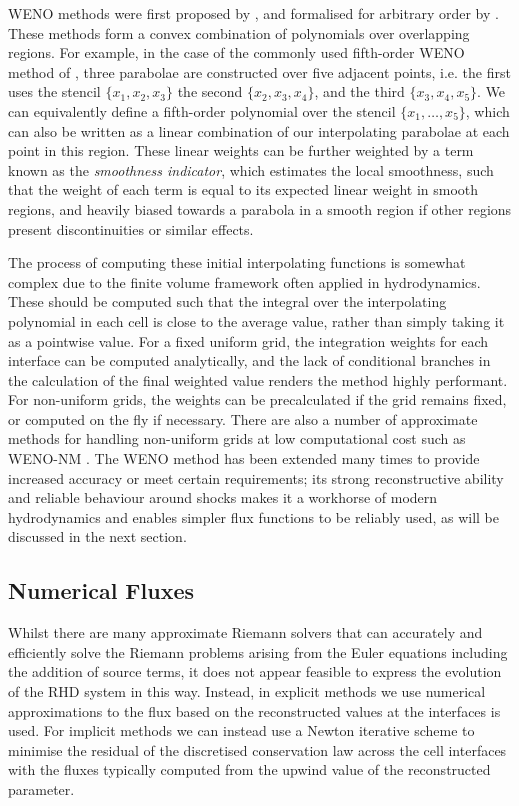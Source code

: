 WENO methods were first proposed by \citet{Liu1994}, and formalised for arbitrary order by \citet{Jiang1996}.
These methods form a convex combination of polynomials over overlapping regions.
For example, in the case of the commonly used fifth-order WENO method of \citet{Jiang1996}, three parabolae are constructed over five adjacent points, i.e. the first uses the stencil $\{x_1, x_2, x_3\}$ the second $\{x_2, x_3, x_4\}$, and the third $\{x_3, x_4, x_5\}$.
We can equivalently define a fifth-order polynomial over the stencil $\{x_1, \ldots, x_5\}$, which can also be written as a linear combination of our interpolating parabolae at each point in this region.
These linear weights can be further weighted by a term known as the \emph{smoothness indicator}, which estimates the local smoothness, such that the weight of each term is equal to its expected linear weight in smooth regions, and heavily biased towards a parabola in a smooth region if other regions present discontinuities or similar effects.

The process of computing these initial interpolating functions is somewhat complex due to the finite volume framework often applied in hydrodynamics.
These should be computed such that the integral over the interpolating polynomial in each cell is close to the average value, rather than simply taking it as a pointwise value.
For a fixed uniform grid, the integration weights for each interface can be computed analytically, and the lack of conditional branches in the calculation of the final weighted value renders the method highly performant.
For non-uniform grids, the weights can be precalculated if the grid remains fixed, or computed on the fly if necessary.
There are also a number of approximate methods for handling non-uniform grids at low computational cost such as WENO-NM \citep{Huang2018}.
The WENO method has been extended many times to provide increased accuracy or meet certain requirements; its strong reconstructive ability and reliable behaviour around shocks makes it a workhorse of modern hydrodynamics and enables simpler flux functions to be reliably used, as will be discussed in the next section.


\subsection{Numerical Fluxes}

Whilst there are many approximate Riemann solvers that can accurately and efficiently solve the Riemann problems arising from the Euler equations including the addition of source terms, it does not appear feasible to express the evolution of the RHD system in this way.
Instead, in explicit methods we use numerical approximations to the flux based on the reconstructed values at the interfaces is used.
For implicit methods we can instead use a Newton iterative scheme to minimise the residual of the discretised conservation law across the cell interfaces with the fluxes typically computed from the upwind value of the reconstructed parameter.

